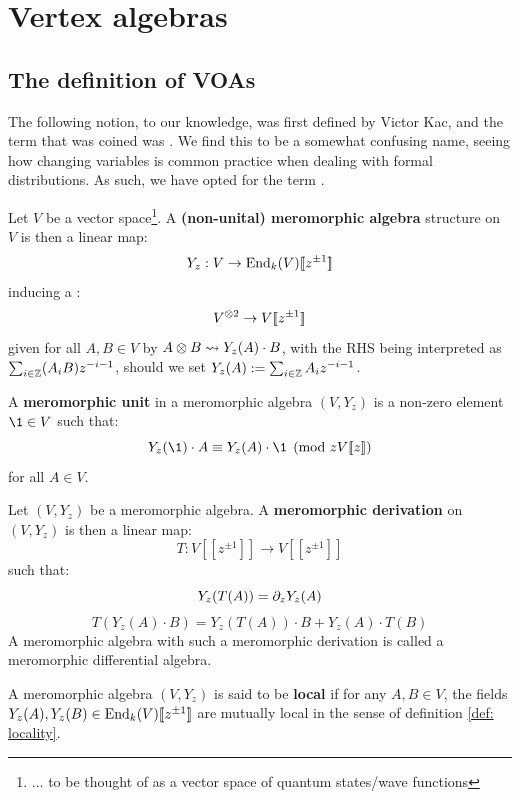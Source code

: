 \section{Vertex algebras}
    \subsection{The definition of VOAs}
        The following notion, to our knowledge, was first defined by Victor Kac, and the term that was coined was . We find this to be a somewhat confusing name, seeing how changing variables is common practice when dealing with formal distributions. As such, we have opted for the term .
        \begin{definition} \label{def: meromorphic_algebras}
            Let $V$ be a vector space\footnote{... to be thought of as a vector space of quantum states/wave functions}. A \textbf{(non-unital) meromorphic algebra} structure on $V$ is then a linear map:
                $$Y_z: V \to \operatorname{End}_k(V)[\![z^{\pm 1}]\!]$$
            inducing a :
                $$V^{\tensor 2} \to V[\![z^{\pm 1}]\!]$$
            given for all $A, B \in V$ by $A \tensor B \mapsto Y_z(A) \cdot B$, with the RHS being interpreted as $\sum_{i \in \mathbb{Z}} (A_i B) z^{- i - 1}$, should we set $Y_z(A) := \sum_{i \in \mathbb{Z}} A_i z^{-i - 1}$.

            A \textbf{meromorphic unit} in a meromorphic algebra $(V, Y_z)$ is a non-zero element $\1 \in V$ such that:
                $$Y_z(\1) \cdot A \equiv Y_z(A) \cdot \1 \pmod{z V[\![z]\!]}$$
            for all $A \in V$.
        \end{definition}
        \begin{remark}
            
        \end{remark}
        \begin{definition} \label{def: meromorphic_differential_algebras}
            Let $(V, Y_z)$ be a meromorphic algebra. A \textbf{meromorphic derivation} on $(V, Y_z)$ is then a linear map:
                $$T: V[\![z^{\pm 1}]\!] \to V[\![z^{\pm 1}]\!]$$
            such that:
                $$Y_z( T(A) ) = \partial_z Y_z(A)$$
                $$T( Y_z(A) \cdot B ) = Y_z( T(A) ) \cdot B + Y_z(A) \cdot T(B)$$
            A meromorphic algebra with such a meromorphic derivation is called a meromorphic differential algebra.
        \end{definition}
        \begin{definition} \label{def: local_meromorphic_algebras}
            A meromorphic algebra $(V, Y_z)$ is said to be \textbf{local} if for any $A, B \in V$, the fields $Y_z(A), Y_z(B) \in \operatorname{End}_k(V)[\![z^{\pm 1}]\!]$ are mutually local in the sense of definition \ref{def: locality}.
        \end{definition}

